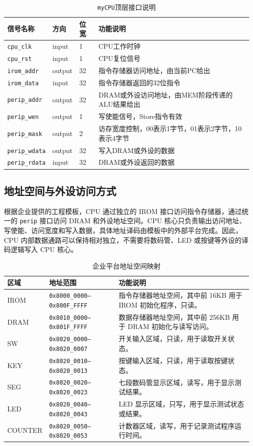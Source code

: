 \documentclass[UTF8,a4paper,12pt]{ctexart}
\newcommand{\code}[1]{\texttt{#1}}
\begin{document}
\begin{table}[H]
\centering
\caption{\code{myCPU}顶层接口说明}
\begin{tabularx}{\textwidth}{p{3cm}p{2cm}p{2cm}X}
\toprule
信号名称 & 方向 & 位宽 & 功能说明 \\
\midrule
\code{cpu\_clk} & input & 1 & CPU工作时钟 \\
\code{cpu\_rst} & input & 1 & CPU复位信号 \\
\code{irom\_addr} & output & 32 & 指令存储器访问地址，由当前PC给出 \\
\code{irom\_data} & input & 32 & 指令存储器返回的32位指令 \\
\code{perip\_addr} & output & 32 & DRAM或外设访问地址，由MEM阶段传递的ALU结果给出 \\
\code{perip\_wen} & output & 1 & 写使能信号，Store指令有效 \\
\code{perip\_mask} & output & 2 & 访存宽度控制，00表示1字节，01表示2字节，10表示4字节 \\
\code{perip\_wdata} & output & 32 & 写入DRAM或外设的数据 \\
\code{perip\_rdata} & input & 32 & DRAM或外设返回的数据 \\
\bottomrule
\end{tabularx}
\end{table}


\subsection{地址空间与外设访问方式}

根据企业提供的工程模板，CPU 通过独立的 IROM 接口访问指令存储器，通过统一的 \code{perip} 接口访问 DRAM 和外设地址空间。CPU 核心只负责输出访问地址、写使能、访问宽度和写入数据，具体地址译码由模板中的外部平台完成。因此，CPU 内部数据通路可以保持相对独立，不需要将数码管、LED 或按键等外设的译码逻辑写入 CPU 核心。

\begin{table}[H]
\centering
\caption{企业平台地址空间映射}
\footnotesize
\renewcommand{\arraystretch}{1.2}
\begin{tabularx}{\textwidth}{p{3cm}p{4.2cm}X}
\toprule
区域 & 地址范围 & 功能说明 \\
\midrule
IROM & \code{0x8000\_0000--0x800F\_FFFF} & 指令存储器地址空间，其中前 16KB 用于 IROM 初始化程序，只读。 \\
DRAM & \code{0x8010\_0000--0x801F\_FFFF} & 数据存储器地址空间，其中前 256KB 用于 DRAM 初始化与读写访问。 \\
SW & \code{0x8020\_0000--0x8020\_0007} & 开关输入区域，只读，用于读取开关状态。 \\
KEY & \code{0x8020\_0010--0x8020\_0013} & 按键输入区域，只读，用于读取按键状态。 \\
SEG & \code{0x8020\_0020--0x8020\_0023} & 七段数码管显示区域，读写，用于显示测试结果。 \\
LED & \code{0x8020\_0040--0x8020\_0043} & LED 显示区域，只写，用于显示测试状态或结果。 \\
COUNTER & \code{0x8020\_0050--0x8020\_0053} & 计数器区域，读写，用于记录测试程序运行时间。 \\
\bottomrule
\end{tabularx}
\end{table}
\end{document}
